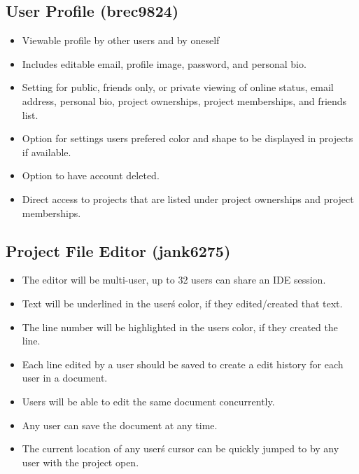 \documentclass[11pt]{report}
\begin{document}
    \subsection{User Profile (brec9824)}
        \begin{itemize}
            \item Viewable profile by other users and by oneself
            \item Includes editable email, profile image, password, and personal bio.
            \item Setting for public, friends only, or private viewing of online status, email address, personal bio, project ownerships, project memberships, and friends list.
            \item Option for settings users prefered color and shape to be displayed in projects if available.
            \item Option to have account deleted.
        	\item Direct access to projects that are listed under project ownerships and project memberships.
        \end{itemize}
    \subsection{Project File Editor (jank6275)}
        \begin{itemize}
            \item The editor will be multi-user, up to 32 users can share an IDE session.
            \item Text will be underlined in the user\'s color, if they edited/created that text.
            \item The line number will be highlighted in the users color, if they created the line.
            \item Each line edited by a user should be saved to create a edit history for each user in a document.
            \item Users will be able to edit the same document concurrently.
            \item Any user can save the document at any time.
            \item The current location of any user\'s cursor can be quickly jumped to by any user with the project open.
        \end{itemize}
\end{document}
